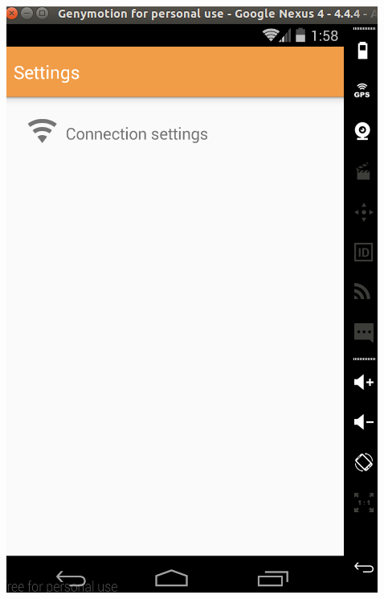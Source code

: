 \documentclass[letterpaper,10pt,english]{sphinxmanual}
\begin{document}
\includegraphics{connectionSettings1.png}
\end{document}
